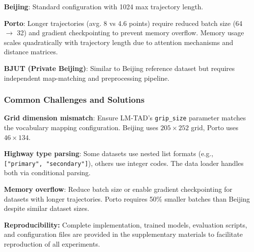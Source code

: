 \textbf{Beijing}: Standard configuration with 1024 max trajectory length.

\textbf{Porto}: Longer trajectories (avg. 8 vs 4.6 points) require reduced batch size (64 $\rightarrow$ 32) and gradient checkpointing to prevent memory overflow. Memory usage scales quadratically with trajectory length due to attention mechanisms and distance matrices.

\textbf{BJUT (Private Beijing)}: Similar to Beijing reference dataset but requires independent map-matching and preprocessing pipeline.

\subsubsection{Common Challenges and Solutions}

\textbf{Grid dimension mismatch}: Ensure LM-TAD's \texttt{grip\_size} parameter matches the vocabulary mapping configuration. Beijing uses $205 \times 252$ grid, Porto uses $46 \times 134$.

\textbf{Highway type parsing}: Some datasets use nested list formats (e.g., \texttt{["primary", "secondary"]}), others use integer codes. The data loader handles both via conditional parsing.

\textbf{Memory overflow}: Reduce batch size or enable gradient checkpointing for datasets with longer trajectories. Porto requires 50\% smaller batches than Beijing despite similar dataset sizes.

\textbf{Reproducibility:} Complete implementation, trained models, evaluation scripts, and configuration files are provided in the supplementary materials to facilitate reproduction of all experiments.

